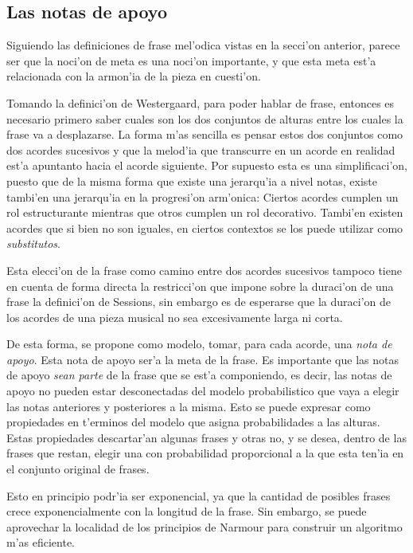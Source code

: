 \subsection{Las notas de apoyo}
Siguiendo las definiciones
de frase mel'odica vistas en la secci'on anterior, parece ser que la noci'on de meta es una noci'on importante, y que esta meta
est'a relacionada con la armon'ia de la pieza en cuesti'on. 

Tomando la definici'on de Westergaard, para poder hablar de frase, entonces es necesario primero saber cuales son los dos conjuntos de 
alturas entre los cuales la frase va a desplazarse. La forma m'as sencilla es pensar estos dos conjuntos como dos acordes sucesivos
y que la melod'ia que transcurre en un acorde en realidad est'a apuntanto hacia el acorde siguiente. Por supuesto
esta es una simplificaci'on, puesto que de la misma forma que existe una jerarqu'ia a nivel notas, existe tambi'en una jerarqu'ia
en la progresi'on arm'onica: Ciertos acordes cumplen un rol estructurante mientras que otros cumplen un rol decorativo. Tambi'en
existen acordes que si bien no son iguales, en ciertos contextos se los puede utilizar como \emph{substitutos}. 

Esta elecci'on de la frase como camino entre dos acordes sucesivos tampoco tiene en cuenta de forma directa la restricci'on 
que impone sobre la duraci'on de una frase la definici'on de Sessions, sin embargo es de esperarse que la duraci'on de los acordes de una pieza musical
no sea excesivamente larga ni corta. 

De esta forma, se propone como modelo, tomar, para cada acorde, una \emph{nota de apoyo}. Esta nota de apoyo ser'a la meta de 
la frase. Es importante que las notas de apoyo \emph{sean parte} de la frase que se est'a componiendo, es decir, las notas
de apoyo no pueden estar desconectadas del modelo probabilistico que vaya a elegir las notas anteriores y posteriores a la misma. 
Esto se puede expresar como propiedades en t'erminos del modelo que asigna probabilidades a las alturas. 
Estas propiedades descartar'an algunas frases y otras no, y se desea, dentro de las frases que restan, elegir una con probabilidad
proporcional a la que esta ten'ia en el conjunto original de frases. 

Esto en principio podr'ia ser exponencial, ya que la cantidad de posibles frases crece exponencialmente con la longitud de la frase.
Sin embargo, se puede aprovechar la localidad de los principios de Narmour para construir un algoritmo m'as eficiente.  

